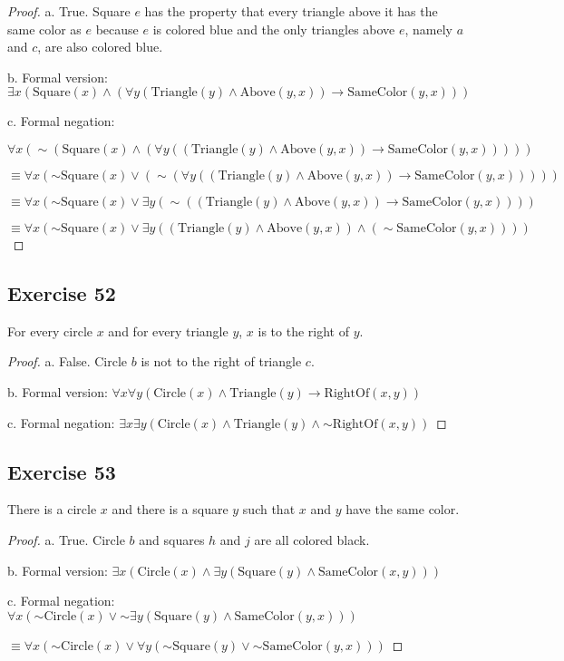 \documentclass[14pt]{extarticle}
\newcommand{\fa}{\forall}
\newcommand{\te}{\exists}
\begin{document}
\begin{proof}
    a. True. Square $e$ has the property that every triangle above it has the same color as $e$ because $e$ is colored blue and the only triangles above $e$, namely $a$ and $c$, are also colored blue.

    b. Formal version: $\te x(\text{Square}(x) \wedge (\fa y(\text{Triangle}(y) \wedge \text{Above}(y, x)) \to \text{SameColor}(y, x)))$

    c. Formal negation:

    $\fa x({\sim(\text{Square}(x) \wedge (\fa y((\text{Triangle}(y) \wedge \text{Above}(y, x)) \to \text{SameColor}(y, x))))})$

    $\equiv \fa x({\sim \text{Square}(x)} \vee ({\sim(\fa y((\text{Triangle}(y) \wedge \text{Above}(y, x)) \to \text{SameColor}(y, x)))}))$

    $\equiv \fa x({\sim \text{Square}(x)} \vee \te y({\sim((\text{Triangle}(y) \wedge \text{Above}(y, x)) \to \text{SameColor}(y, x))}))$

    $\equiv \fa x({\sim\text{Square}(x)} \vee \te y((\text{Triangle}(y) \wedge \text{Above}(y, x)) \wedge ({\sim\text{SameColor}(y, x)})))$
\end{proof}

\subsection{Exercise 52}
For every circle $x$ and for every triangle $y$, $x$ is to the right of $y$.

\begin{proof}
    a. False. Circle $b$ is not to the right of triangle $c$.

    b. Formal version: $\fa x \fa y (\text{Circle}(x) \wedge \text{Triangle}(y) \to \text{RightOf}(x, y))$

    c. Formal negation: $\te x \te y (\text{Circle}(x) \wedge \text{Triangle}(y) \wedge {\sim\text{RightOf}(x, y)})$
\end{proof}

\subsection{Exercise 53}
There is a circle $x$ and there is a square $y$ such that $x$ and $y$ have the same color.

\begin{proof}
    a. True. Circle $b$ and squares $h$ and $j$ are all colored
    black.

    b. Formal version: $\te x(\text{Circle}(x) \wedge \te y(\text{Square}(y) \wedge \text{SameColor}(x, y)))$

    c. Formal negation: $\fa x({\sim\text{Circle}(x)} \vee {\sim \te y(\text{Square}(y) \wedge \text{SameColor}(y, x))})$

    $\equiv \fa x({\sim\text{Circle}(x)} \vee \fa y({\sim\text{Square}(y)} \vee {\sim\text{SameColor}(y, x)}))$
\end{proof}
\end{document}
